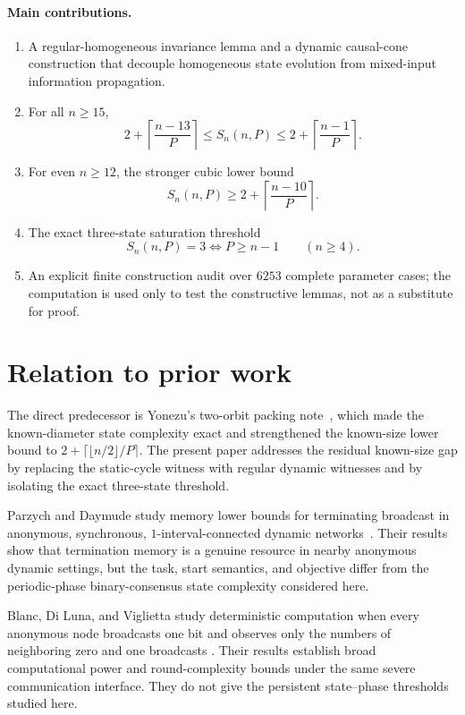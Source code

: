 \documentclass[11pt]{article}
\theoremstyle{remark}
\begin{document}
\paragraph{Main contributions.}
\begin{enumerate}[leftmargin=1.5em]
\item A regular-homogeneous invariance lemma and a dynamic causal-cone construction that
decouple homogeneous state evolution from mixed-input information propagation.
\item For all $n\ge15$,
\[
2+\left\lceil\frac{n-13}{P}\right\rceil
\le S_n(n,P)\le
2+\left\lceil\frac{n-1}{P}\right\rceil.
\]
\item For even $n\ge12$, the stronger cubic lower bound
\[
S_n(n,P)\ge
2+\left\lceil\frac{n-10}{P}\right\rceil.
\]
\item The exact three-state saturation threshold
\[
S_n(n,P)=3\iff P\ge n-1
\qquad(n\ge4).
\]
\item An explicit finite construction audit over $6253$ complete parameter cases; the
computation is used only to test the constructive lemmas, not as a substitute for proof.
\end{enumerate}

\section{Relation to prior work}

The direct predecessor is Yonezu's two-orbit packing note~\cite{yonezu2026twoorbit},
which made the known-diameter state complexity exact and strengthened the known-size lower
bound to
$2+\lceil\lfloor n/2\rfloor/P\rceil$.  The present paper addresses the residual known-size
gap by replacing the static-cycle witness with regular dynamic witnesses and by isolating
the exact three-state threshold.

Parzych and Daymude study memory lower bounds for terminating broadcast in anonymous,
synchronous, $1$-interval-connected dynamic networks~\cite{parzych2026}.  Their results
show that termination memory is a genuine resource in nearby anonymous dynamic settings,
but the task, start semantics, and objective differ from the periodic-phase binary-consensus
state complexity considered here.

Blanc, Di Luna, and Viglietta study deterministic computation when every anonymous node
broadcasts one bit and observes only the numbers of neighboring zero and one broadcasts
\cite{blanc2026}.  Their results establish broad computational power and round-complexity
bounds under the same severe communication interface.  They do not give the persistent
state--phase thresholds studied here.
\end{document}
